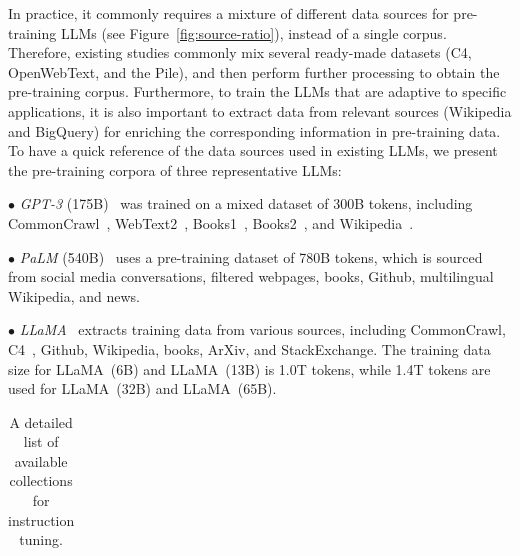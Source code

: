 {{{In practice, it commonly requires a mixture of different data sources for pre-training LLMs (see Figure~\ref{fig:source-ratio}), instead of a single corpus.
{Therefore, existing studies commonly mix several ready-made datasets (\eg C4, OpenWebText, and the Pile), and then perform further processing to obtain the pre-training corpus.
Furthermore, to train the LLMs that are adaptive to specific applications, it is also important to extract  data from  relevant sources (\eg Wikipedia and BigQuery) for enriching the corresponding information in pre-training data.} 
To have a quick reference of the data sources used in existing LLMs, we present the pre-training corpora of three representative LLMs:  

$\bullet$ \emph{GPT-3} (175B)~\cite{Brown-NeurIPS-2020-Language} was trained on a mixed dataset of 300B tokens, including  CommonCrawl~\cite{commoncrawl}, WebText2~\cite{Brown-NeurIPS-2020-Language}, Books1~\cite{Brown-NeurIPS-2020-Language}, Books2~\cite{Brown-NeurIPS-2020-Language}, and Wikipedia~\cite{Wikipedia}. 

$\bullet$ \emph{PaLM} (540B)~\cite{Chowdhery-arxiv-2022-PaLM} uses a pre-training dataset of 780B tokens, which is sourced from social media conversations, filtered webpages, books, Github, multilingual Wikipedia, and news.

$\bullet$ \emph{LLaMA}~\cite{Touvron-arxiv-2023-LLaMA} extracts training data from various sources, including CommonCrawl, C4~\cite{Raffel-JMLR-2020-Exploring}, Github, Wikipedia, books, ArXiv, and StackExchange. The training data size for LLaMA~(6B) and LLaMA~(13B) is 1.0T tokens, while 1.4T tokens are used for LLaMA~(32B) and LLaMA~(65B). 


\begin{table}[h]
    \centering
    \caption{A detailed list of available collections for instruction tuning. %
    }
    \footnotesize
    \renewcommand\tabcolsep{2.5pt}
    \begin{tabular}{clcccc}
    \toprule
    

\end{tabular}
\end{table}}}}

